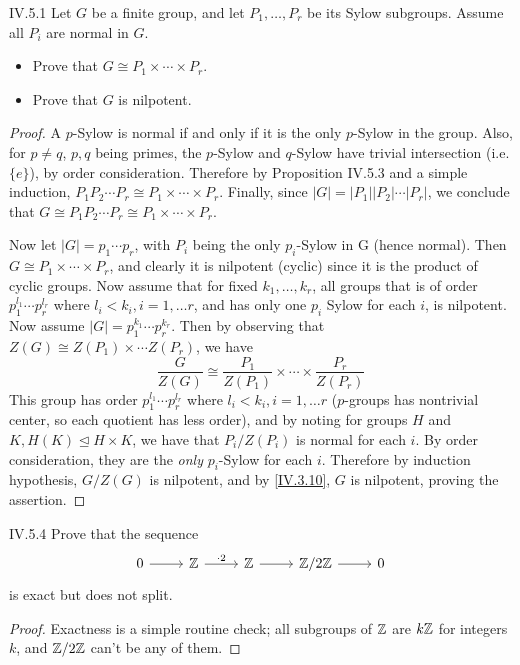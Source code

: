 \begin{problem}{IV.5.1}
Let $G$ be a finite group, and let $P_1, \dotsc, P_r$ be its Sylow subgroups. Assume all $P_i$ are normal in $G$.
\begin{itemize}
	\setlength\itemsep{0pt}
	\item Prove that $G \cong P_1 \times \cdots \times P_r$.
	\item Prove that $G$ is nilpotent.
\end{itemize}
\end{problem}
\begin{proof}
A $p$-Sylow is normal if and only if it is the only $p$-Sylow in the group. Also, for $p \neq q$, $p, q$ being primes, the $p$-Sylow and $q$-Sylow have trivial intersection (i.e. $\{e\}$), by order consideration. Therefore by Proposition IV.5.3 and a simple induction, $P_1P_2 \cdots P_r \cong P_1 \times \cdots \times P_r$. Finally, since $|G| = |P_1||P_2| \cdots |P_r|$, we conclude that $G \cong P_1P_2 \cdots P_r \cong P_1 \times \cdots \times P_r$. 

Now let $|G| = p_1\cdots p_r$, with $P_i$ being the only $p_i$-Sylow in G (hence normal). Then $G \cong P_1 \times \cdots \times P_r$, and clearly it is nilpotent (cyclic) since it is the product of cyclic groups. Now assume that for fixed $k_1,\dotsc, k_r$, all groups that is of order $p_1^{l_1}\cdots p_r^{l_r}$ where $l_i < k_i, i = 1,\dotsc r$, and has only one $p_i$ Sylow for each $i$, is nilpotent. Now assume $|G| = p_1^{k_1}\cdots p_r^{k_r}$. Then by observing that $Z(G) \cong Z(P_1) \times \cdots Z(P_r)$, we have 
\[
\frac{G}{Z(G)} \cong \frac{P_1}{Z(P_1)} \times \cdots \times \frac{P_r}{Z(P_r)}	
\]
This group has order $p_1^{l_1}\cdots p_r^{l_r}$ where $l_i < k_i, i = 1,\dotsc r$ ($p$-groups has nontrivial center, so each quotient has less order), and by noting for groups $H$ and $K, H (K) \unlhd H \times K$, we have that $P_i/Z(P_i)$ is normal for each $i$. By order consideration, they are the \emph{only} $p_i$-Sylow for each $i$. Therefore by induction hypothesis, $G/Z(G)$ is nilpotent, and by \ref{IV.3.10}, $G$ is nilpotent, proving the assertion.

\end{proof}

\begin{problem}{IV.5.4}
Prove that the sequence
\[
\begin{tikzcd}
0 \arrow[r] &\Z \arrow[r, "\cdot 2"] &\Z \arrow[r] &\Z/2\Z \arrow[r] &0
\end{tikzcd}
\]
is exact but does not split.
\end{problem}
\begin{proof}
Exactness is a simple routine check; all subgroups of $\mathbb{Z}$ are $k\mathbb{Z}$ for integers $k$, and $\mathbb{Z}/2\mathbb{Z}$ can't be any of them.
\end{proof}

